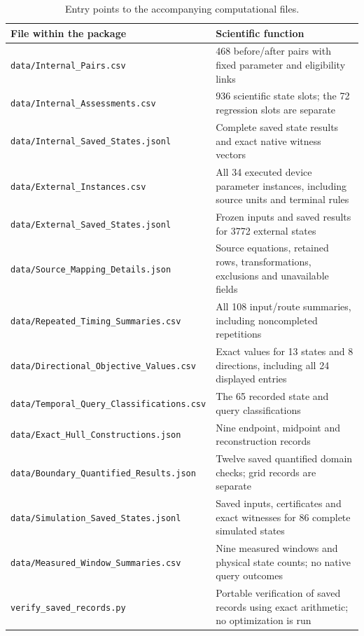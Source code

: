 \begin{longtable}{@{}p{.43\linewidth}p{.51\linewidth}@{}}
\caption{Entry points to the accompanying computational files.}\label{tab:data_interfaces}\\
\toprule File within the package & Scientific function\\\midrule
\bottomrule
\texttt{data/Internal\_Pairs.csv} &468 before/after pairs with fixed parameter and eligibility links\\
\texttt{data/Internal\_Assessments.csv} &936 scientific state slots; the 72 regression slots are separate\\
\texttt{data/Internal\_Saved\_States.jsonl} &Complete saved state results and exact native witness vectors\\
\texttt{data/External\_Instances.csv} &All 34 executed device parameter instances, including source units and terminal rules\\
\texttt{data/External\_Saved\_States.jsonl} &Frozen inputs and saved results for 3772 external states\\
\texttt{data/Source\_Mapping\_Details.json} &Source equations, retained rows, transformations, exclusions and unavailable fields\\
\texttt{data/Repeated\_Timing\_Summaries.csv} &All 108 input/route summaries, including noncompleted repetitions\\
\texttt{data/Directional\_Objective\_Values.csv} &Exact values for 13 states and 8 directions, including all 24 displayed entries\\
\texttt{data/Temporal\_Query\_Classifications.csv} &The 65 recorded state and query classifications\\
\texttt{data/Exact\_Hull\_Constructions.json} &Nine endpoint, midpoint and reconstruction records\\
\texttt{data/Boundary\_Quantified\_Results.json} &Twelve saved quantified domain checks; grid records are separate\\
\texttt{data/Simulation\_Saved\_States.jsonl} &Saved inputs, certificates and exact witnesses for 86 complete simulated states\\
\texttt{data/Measured\_Window\_Summaries.csv} &Nine measured windows and physical state counts; no native query outcomes\\
\texttt{verify\_saved\_records.py} &Portable verification of saved records using exact arithmetic; no optimization is run\\
\end{longtable}

